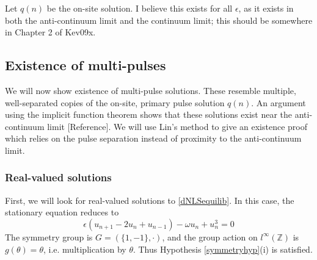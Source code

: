 \documentclass[12pt]{article}
\def\Z{{\mathbb Z}}
\begin{document}
Let $q(n)$ be the on-site solution. I believe this exists for all $\epsilon$, as it exists in both the anti-continuum limit and the continuum limit; this should be somewhere in Chapter 2 of Kev09x.

\subsection{Existence of multi-pulses}

We will now show existence of multi-pulse solutions. These resemble multiple, well-separated copies of the on-site, primary pulse solution $q(n)$. An argument using the implicit function theorem shows that these solutions exist near the anti-continuum limit [Reference]. We will use Lin's method to give an existence proof which relies on the pulse separation instead of proximity to the anti-continuum limit.

\subsubsection{Real-valued solutions}

First, we will look for real-valued solutions to \eqref{dNLSequilib}. In this case, the stationary equation reduces to
\begin{equation}\label{dNLSequilibreal}
\epsilon(u_{n+1} - 2 u_n + u_{n-1}) - \omega u_n + u_n^3 = 0
\end{equation}
The symmetry group is $G = (\{1, -1\}, \cdot)$, and the group action on $l^\infty(\Z)$ is $g(\theta) = \theta$, i.e. multiplication by $\theta$. Thus Hypothesis \eqref{symmetryhyp}(i) is satisfied.
\end{document}
